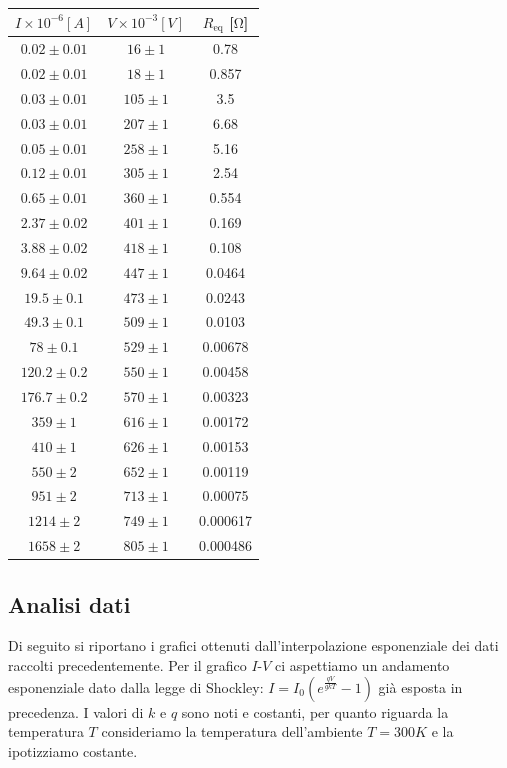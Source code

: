 \documentclass[a4paper]{article}
\begin{document}
\begin{center}
\begin{tabular}{|c|c|c|}
\hline
$I \times 10^{-6}[A]$ & $V \times 10^{-3}[V]$ & $R_{\text{eq}}$ [$\si{\ohm}$]\\
\hline
$0.02 \pm 0.01$ & $16 \pm 1$ & 0.78 \\
$0.02 \pm 0.01$ & $18 \pm 1$ & 0.857 \\
$0.03 \pm 0.01$ & $105 \pm 1$ & 3.5 \\
$0.03 \pm 0.01$ & $207 \pm 1$ & 6.68 \\
$0.05 \pm 0.01$ & $258 \pm 1$ & 5.16 \\
$0.12 \pm 0.01$ & $305 \pm 1$ & 2.54 \\
$0.65 \pm 0.01$ & $360 \pm 1$ & 0.554 \\
$2.37 \pm 0.02$ & $401 \pm 1$ & 0.169 \\
$3.88 \pm 0.02$ & $418 \pm 1$ & 0.108 \\
$9.64 \pm 0.02$ & $447 \pm 1$ & 0.0464 \\
$19.5 \pm 0.1$ & $473 \pm 1$ & 0.0243 \\
$49.3 \pm 0.1$ & $509 \pm 1$ & 0.0103 \\
$78 \pm 0.1$ & $529 \pm 1$ & 0.00678 \\
$120.2 \pm 0.2$ & $550 \pm 1$ & 0.00458 \\
$176.7 \pm 0.2$ & $570 \pm 1$ & 0.00323 \\
$359 \pm 1$ & $616 \pm 1$ & 0.00172 \\
$410 \pm 1$ & $626 \pm 1$ & 0.00153 \\
$550 \pm 2$ & $652 \pm 1$ & 0.00119 \\
$951 \pm 2$ & $713 \pm 1$ & 0.00075 \\
$1214 \pm 2$ & $749 \pm 1$ & 0.000617 \\
$1658 \pm 2$ & $805 \pm 1$ & 0.000486 \\
\hline
\end{tabular}
\end{center}

\subsection{Analisi dati}
Di seguito si riportano i grafici ottenuti dall'interpolazione esponenziale dei dati raccolti precedentemente. Per il grafico  $I$-$V$ ci aspettiamo un andamento esponenziale dato dalla legge di Shockley:  $I = I_0 \left( e^{\frac{qV}{gkT}} - 1 \right)$ già esposta in precedenza. I valori di $k$ e $q$ sono noti e costanti, per quanto riguarda la temperatura $T$ consideriamo la temperatura dell'ambiente  $T=300K$ e la ipotizziamo costante.
\end{document}
